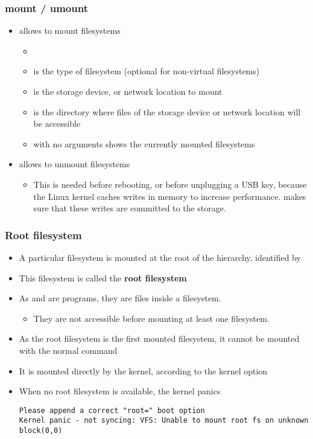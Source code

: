 \begin{frame}
  \frametitle{mount / umount}
  \begin{itemize}
  \item {} allows to mount filesystems
    \begin{itemize}
    \item {}
    \item {} is the type of filesystem (optional for
	non-virtual filesystems)
    \item {} is the storage device, or network location to
      mount
    \item {} is the directory where files of the
      storage device or network location will be accessible
    \item {} with no arguments shows the currently mounted
      filesystems
    \end{itemize}
  \item {} allows to unmount filesystems
    \begin{itemize}
    \item This is needed before rebooting, or before unplugging a USB
      key, because the Linux kernel caches writes in memory to
      increase performance.  makes sure that these writes are
      committed to the storage.
    \end{itemize}
  \end{itemize}
\end{frame}

\begin{frame}[fragile]
  \frametitle{Root filesystem}
  \begin{itemize}
  \item A particular filesystem is mounted at the root of the hierarchy,
    identified by \code{/}
  \item This filesystem is called the {\bf root filesystem}
  \item As  and  are programs, they are files
    inside a filesystem.
    \begin{itemize}
    \item They are not accessible before mounting at least one filesystem.
    \end{itemize}
  \item As the root filesystem is the first mounted filesystem, it
    cannot be mounted with the normal  command
  \item It is mounted directly by the kernel, according to the
     kernel option
  \item When no root filesystem is available, the kernel panics\\
    \tiny
\begin{verbatim}
Please append a correct "root=" boot option
Kernel panic - not syncing: VFS: Unable to mount root fs on unknown block(0,0)
\end{verbatim}
  \end{itemize}
\end{frame}

